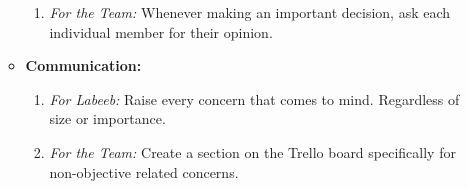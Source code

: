 \documentclass[12pt, titlepage]{article}
\begin{document}
\begin{enumerate}
\begin{itemize}
\begin{enumerate}
		\item \textit{For the Team:} Whenever making an important decision, ask each individual member for their opinion.
		\end{enumerate}
	\item \textbf{Communication:}
		\begin{enumerate}
		\item \textit{For Labeeb:} Raise every concern that comes to mind. Regardless of size or importance.
		\item \textit{For the Team:} Create a section on the Trello board specifically for non-objective related concerns.
		\end{enumerate}
	\end{itemize}
\end{enumerate}
\end{document}
